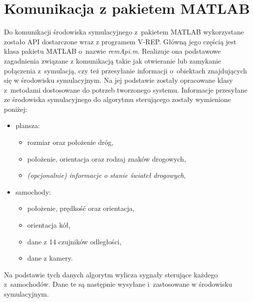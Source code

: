 \section{Komunikacja z pakietem MATLAB}

Do komunikacji środowiska symulacyjnego z~pakietem MATLAB wykorzystane zostało API dostarczone wraz z programem V-REP. Główną jego częścią jest klasa pakietu MATLAB o~nazwie \textit{remApi.m}. Realizuje ona podstawowe zagadnienia związane z komunikacją takie jak otwieranie lub zamykanie połączenia z~symulacją, czy też przesyłanie informacji o~obiektach znajdujących się w środowisku symulacyjnym. Na jej podstawie zostały opracowane klasy z~metodami dostosowane do potrzeb tworzonego systemu. Informacje przesyłane ze środowiska symulacyjnego do algorytmu sterującego zostały wymienione poniżej:
\begin{itemize}
	\item plansza:
	\begin{itemize}
		\item rozmiar oraz położenie dróg,
		\item położenie, orientacja oraz rodzaj znaków drogowych,
		\item \textit{(opcjonalnie) informacje o stanie świateł drogowych},
	\end{itemize}
	\item samochody:
	\begin{itemize}
		\item położenie, prędkość oraz orientacja,
		\item orientacja kół,
		\item dane z 14 czujników odległości,
		\item dane z kamery.
	\end{itemize}
\end{itemize}
Na podstawie tych danych algorytm wylicza sygnały sterujące każdego z~samochodów. Dane te są następnie wysyłane i~zastosowane w środowisku symulacyjnym.